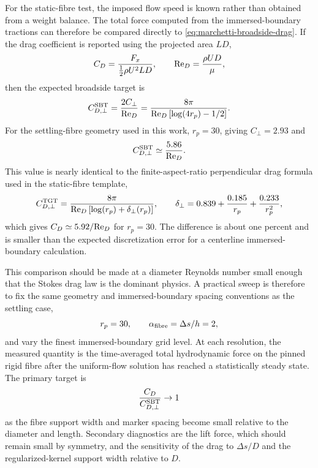 For the static-fibre test, the imposed flow speed is known rather than obtained
from a weight balance. The total force computed from the immersed-boundary
tractions can therefore be compared directly to
\eqref{eq:marchetti-broadside-drag}. If the drag coefficient is reported using
the projected area \(LD\),
\begin{equation}
    C_D
    =
    \frac{F_x}{\frac{1}{2}\rho U^2 LD},
    \qquad
    {\text {Re}}_D
    =
    \frac{\rho U D}{\mu},
\end{equation}
then the expected broadside target is
\begin{equation}
    C_{D,\perp}^{\rm SBT}
    =
    \frac{2C_{\perp}}{{\text {Re}}_D}
    =
    \frac{8\pi}
         {{\text {Re}}_D\left[\log(4r_p)-1/2\right]}.
    \label{eq:marchetti-broadside-cd-target}
\end{equation}
For the settling-fibre geometry used in this work, \(r_p=30\), giving
\(C_{\perp}=2.93\) and
\begin{equation}
    C_{D,\perp}^{\rm SBT}
    \simeq
    \frac{5.86}{{\text {Re}}_D}.
\end{equation}
This value is nearly identical to the finite-aspect-ratio perpendicular drag
formula used in the static-fibre template,
\begin{equation}
    C_{D,\perp}^{\rm TGT}
    =
    \frac{8\pi}
         {{\text {Re}}_D\left[\log(r_p)+\delta_{\perp}(r_p)\right]},
    \qquad
    \delta_{\perp}
    =
    0.839+\frac{0.185}{r_p}+\frac{0.233}{r_p^2},
\end{equation}
which gives \(C_D\simeq 5.92/{\text {Re}}_D\) for \(r_p=30\). The difference is
about one percent and is smaller than the expected discretization error for a
centerline immersed-boundary calculation.

This comparison should be made at a diameter Reynolds number small enough that
the Stokes drag law is the dominant physics. A practical sweep is therefore to
fix the same geometry and immersed-boundary spacing conventions as the settling
case,
\[
    r_p=30,
    \qquad
    \alpha_{\rm fibre}=\Delta s/h=2,
\]
and vary the finest immersed-boundary grid level. At each resolution, the
measured quantity is the time-averaged total hydrodynamic force on the pinned
rigid fibre after the uniform-flow solution has reached a statistically steady
state. The primary target is
\[
    \frac{C_D}{C_{D,\perp}^{\rm SBT}}\to 1
\]
as the fibre support width and marker spacing become small relative to the
diameter and length. Secondary diagnostics are the lift force, which should
remain small by symmetry, and the sensitivity of the drag to \(\Delta s/D\)
and the regularized-kernel support width relative to \(D\).

